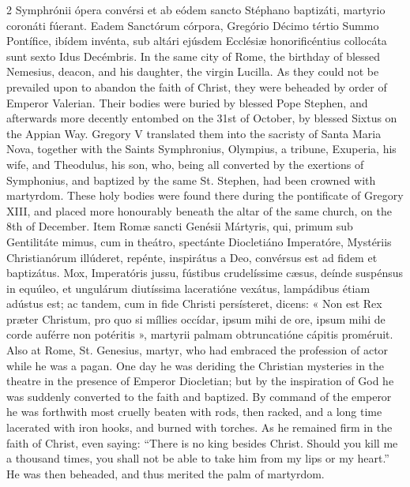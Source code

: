 \begin{paracol}{2}
 Symphrónii ópera convérsi et ab eódem sancto Stéphano baptizáti, martyrio 
 coronáti fúerant. Eadem Sanctórum córpora, Gregório Décimo tértio 
 Summo Pontífice, ibídem invénta, sub altári ejúsdem Ecclésiæ honorificéntius 
 collocáta sunt sexto Idus Decémbris.
\switchcolumn
{}
In the same city of Rome, the 
 birthday of blessed Nemesius, deacon, and his daughter, the virgin Lucilla. 
 As they could not be prevailed upon to abandon the faith of Christ, they 
 were beheaded by order of Emperor Valerian. Their bodies were buried 
 by blessed Pope Stephen, and afterwards more decently entombed on the 31st 
 of October, by blessed Sixtus on the Appian Way. Gregory V translated 
 them into the sacristy of Santa Maria Nova, together with the Saints 
 Symphronius, Olympius, a tribune, Exuperia, his wife, and Theodulus, his 
 son, who, being all converted by the exertions of Symphonius, and baptized 
 by the same St. Stephen, had been crowned with martyrdom. These holy 
 bodies were found there during the pontificate of Gregory XIII, and placed 
 more honourably beneath the altar of the same church, on the 8th of 
 December.
\switchcolumn*
{}
Item Romæ sancti 
 Genésii Mártyris, qui, primum sub Gentilitáte mimus, cum in theátro, 
 spectánte Diocletiáno Imperatóre, Mystériis Christianórum illúderet, repénte, 
 inspirátus a Deo, convérsus est ad fidem et baptizátus. Mox, 
 Imperatóris jussu, fústibus crudelíssime cæsus, deínde suspénsus in equúleo, 
 et ungulárum diutíssima laceratióne vexátus, lampádibus étiam adústus est; 
 ac tandem, cum in fide Christi persísteret, dicens: « Non est Rex præter 
 Christum, pro quo si míllies occídar, ipsum mihi de ore, ipsum mihi de corde 
 auférre non potéritis », martyrii palmam obtruncatióne cápitis proméruit.
\switchcolumn
{}
Also at Rome, St. Genesius, martyr, 
 who had embraced the profession of actor while he was a pagan. One day 
 he was deriding the Christian mysteries in the theatre in the presence of 
 Emperor Diocletian; but by the inspiration of God he was suddenly converted 
 to the faith and baptized. By command of the emperor he was forthwith 
 most cruelly beaten with rods, then racked, and a long time lacerated with 
 iron hooks, and burned with torches. As he remained firm in the faith 
 of Christ, even saying: ``There is no king besides Christ. Should you 
 kill me a thousand times, you shall not be able to take him from my lips or 
 my heart.'' He was then beheaded, and thus merited the palm of 
 martyrdom.
\switchcolumn*
{}

\end{paracol}
